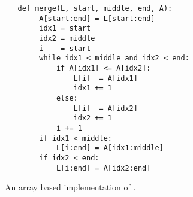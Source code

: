 \begin{figure}[!ht]
  \centering
\begin{verbatim}
   def merge(L, start, middle, end, A):
        A[start:end] = L[start:end]
        idx1 = start
        idx2 = middle
        i    = start
        while idx1 < middle and idx2 < end:
            if A[idx1] <= A[idx2]:
                L[i]  = A[idx1]
                idx1 += 1
            else:
                L[i]  = A[idx2]
                idx2 += 1
            i += 1
        if idx1 < middle:
            L[i:end] = A[idx1:middle]
        if idx2 < end:
            L[i:end] = A[idx2:end]
\end{verbatim}
\vspace*{-0.3cm}
  \caption{An array based implementation of .}
  \label{fig:merge-sort-array.stlx-merge}
\end{figure}

